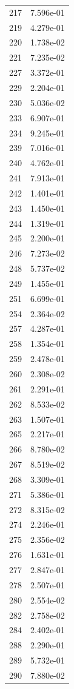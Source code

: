 \documentclass[12pt]{article}
\begin{document}
\begin{longtable}{@{}cc@{}}
217 & 7.596e-01 \\
219 & 4.279e-01 \\
220 & 1.738e-02 \\
221 & 7.235e-02 \\
227 & 3.372e-01 \\
229 & 2.204e-01 \\
230 & 5.036e-02 \\
233 & 6.907e-01 \\
234 & 9.245e-01 \\
239 & 7.016e-01 \\
240 & 4.762e-01 \\
241 & 7.913e-01 \\
242 & 1.401e-01 \\
243 & 1.450e-01 \\
244 & 1.319e-01 \\
245 & 2.200e-01 \\
246 & 7.273e-02 \\
248 & 5.737e-02 \\
249 & 1.455e-01 \\
251 & 6.699e-01 \\
254 & 2.364e-02 \\
257 & 4.287e-01 \\
258 & 1.354e-01 \\
259 & 2.478e-01 \\
260 & 2.308e-02 \\
261 & 2.291e-01 \\
262 & 8.533e-02 \\
263 & 1.507e-01 \\
265 & 2.217e-01 \\
266 & 8.780e-02 \\
267 & 8.519e-02 \\
268 & 3.309e-01 \\
271 & 5.386e-01 \\
272 & 8.315e-02 \\
274 & 2.246e-01 \\
275 & 2.356e-02 \\
276 & 1.631e-01 \\
277 & 2.847e-01 \\
278 & 2.507e-01 \\
280 & 2.554e-02 \\
282 & 2.758e-02 \\
284 & 2.402e-01 \\
288 & 2.290e-01 \\
289 & 5.732e-01 \\
290 & 7.880e-02 \\

\end{longtable}
\end{document}
